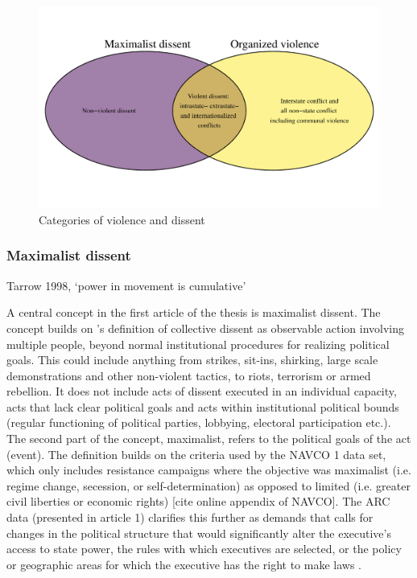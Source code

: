 \documentclass[12pt]{article}
\begin{document}
\begin{figure}[htpb]
	\centering
	\includegraphics[width=\textwidth]{../R/Output/venn.pdf}
	\caption{Categories of violence and dissent}
	\label{venn}
\end{figure}

\subsubsection{Maximalist dissent} \label{Maximalist dissent}

Tarrow 1998, `power in movement is cumulative'

A central concept in the first article of the thesis is maximalist dissent. The
concept builds on \citet{TillyCharles1978Fmtr}'s definition of collective
dissent as observable action involving multiple people, beyond normal
institutional procedures for realizing political goals. This could include
anything from strikes, sit-ins, shirking, large scale demonstrations and other
non-violent tactics, to riots, terrorism or armed rebellion. It does not include
acts of dissent executed in an individual capacity, acts that lack clear
political goals and acts within institutional political bounds (regular
functioning of political parties, lobbying, electoral participation etc.). The
second part of the concept, maximalist, refers to the political goals of the act
(event). The definition builds on the criteria used by the NAVCO 1 data set,
which only includes resistance campaigns where the objective was maximalist
(i.e. regime change, secession, or self-determination) as opposed to limited
(i.e. greater civil liberties or economic rights) [cite online appendix of
NAVCO]. The ARC data (presented in article 1) clarifies this further as demands
that calls for changes in the political structure that would significantly alter
the executive’s access to state power, the rules with which executives are
selected, or the policy or geographic areas for which the executive has the
right to make laws \citep{Butcher_2022}.
\end{document}

